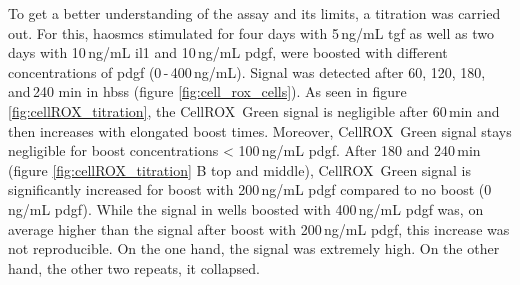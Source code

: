     To get a better understanding of the assay and its limits, a titration was carried out. For this, \acp{haosmc} stimulated for four days with 5\,ng/mL \ac{tgf} as well as two days with 10\,ng/mL \ac{il1} and 10\,ng/mL  \ac{pdgf}, were boosted with different concentrations of \ac{pdgf} (0\,-\,400\,ng/mL). Signal was detected after 60, 120, 180, and\,240 min in \ac{hbss} (figure \ref{fig:cell_rox_cells}). As seen in figure \ref{fig:cellROX_titration}, the CellROX\texttrademark~Green signal is negligible after 60\,min and then increases with elongated boost times. Moreover, CellROX\texttrademark~Green signal stays negligible for boost concentrations < 100\,ng/mL \ac{pdgf}. After 180 and 240\,min (figure \ref{fig:cellROX_titration} B top and middle), CellROX\texttrademark~Green signal is significantly increased for boost with 200\,ng/mL \ac{pdgf} compared to no boost (0\,ng/mL \ac{pdgf}). While the signal in wells boosted with 400\,ng/mL \ac{pdgf} was, on average higher than the signal after boost with 200\,ng/mL \ac{pdgf}, this increase was not reproducible. On the one hand, the signal was extremely high. On the other hand, the other two repeats, it collapsed.

